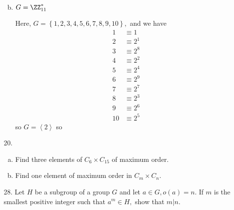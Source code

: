 \documentclass{article}
\begin{document}
\begin{itemize}
\begin{enumerate}[(a)]
\begin{soln}
				\end{soln}

			\item $G=\ZZ_{11}^*$
				\begin{soln}
					Here, $G=\left\{ 1, 2, 3, 4, 5, 6, 7, 8, 9, 10 \right\},$ and we have
					\begin{align*}
						1 &\equiv 1 \\
						2 &\equiv 2^1 \\
						3 &\equiv 2^8 \\
						4 &\equiv 2^2 \\
						5 &\equiv 2^4 \\
						6 &\equiv 2^9 \\
						7 &\equiv 2^7 \\
						8 &\equiv 2^3 \\
						9 &\equiv 2^6 \\
						10 &\equiv 2^5
					\end{align*} so $G=\left< 2\right>$ so 

				\end{soln}
				
		\end{enumerate}

	\item[20.] \begin{enumerate}[(a)]
			\item Find three elements of $C_6\times C_{15}$ of maximum order.

			\item Find one element of maximum order in $C_m\times C_n.$
				
		\end{enumerate}

	\item[28.] Let $H$ be a subgroup of a group $G$ and let $a\in G, o(a)=n.$ If $m$ is the smallest positive integer such that $a^m\in H,$ show that $m|n.$
		
\end{itemize}
\end{document}
